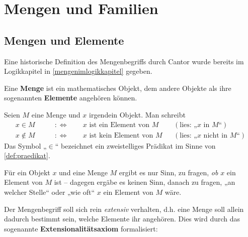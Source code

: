 


    
\chapter{Mengen und Familien}


\section{Mengen und Elemente}


Eine historische Definition des Mengenbegriffs durch Cantor wurde bereits im Logikkapitel in \cref{mengenimlogikkapitel} gegeben.


\begin{de}[Menge] \label{def:menge} 
    Eine \textbf{Menge} ist ein mathematisches Objekt, dem andere Objekte als ihre sogenannten \textbf{Elemente} angehören können.%
\end{de}


\begin{nota}[Elementzeichen]
    Seien $M$ eine Menge und $x$ irgendein Objekt. Man schreibt
    \begin{align*}
        x  \in M \qquad&:\Leftrightarrow\qquad \text{$x$ ist ein Element von $M$} && (\text{lies: „$x$ in $M$“})\\
        x\notin M \qquad &:\Leftrightarrow\qquad \text{$x$ ist kein Element von $M$} && (\text{lies: „$x$ nicht in $M$“})
    \end{align*}
    Das Symbol „$\in$“ bezeichnet ein zweistelliges Prädikat im Sinne von \cref{def:praedikat}.
\end{nota}


\noindent Für ein Objekt $x$ und eine Menge $M$ ergibt es nur Sinn, zu fragen, \emph{ob} $x$ ein Element von $M$ ist -- dagegen ergäbe es keinen Sinn, danach zu fragen, „an welcher Stelle“ oder „wie oft“ $x$ ein Element von $M$ wäre.

Der Mengenbegriff soll sich rein \emph{extensiv} verhalten, d.h. eine Menge soll allein dadurch bestimmt sein, welche Elemente ihr angehören. Dies wird durch das sogenannte \textbf{Extensionalitätsaxiom} formalisiert:


